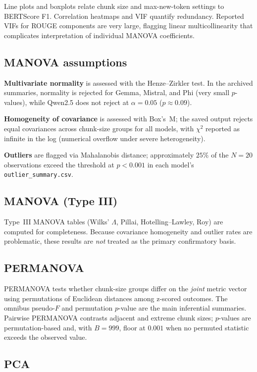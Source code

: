 \documentclass[11pt]{article}
\begin{document}
Line plots and boxplots relate chunk size and max-new-token settings to BERTScore F1. Correlation heatmaps and VIF quantify redundancy. Reported VIFs for ROUGE components are very large, flagging linear multicollinearity that complicates interpretation of individual MANOVA coefficients.

\subsection{MANOVA assumptions}

\textbf{Multivariate normality} is assessed with the Henze--Zirkler test. In the archived summaries, normality is rejected for Gemma, Mistral, and Phi (very small $p$-values), while Qwen2.5 does not reject at $\alpha=0.05$ ($p\approx 0.09$).

\textbf{Homogeneity of covariance} is assessed with Box's~M; the saved output rejects equal covariances across chunk-size groups for all models, with $\chi^2$ reported as infinite in the log (numerical overflow under severe heterogeneity).

\textbf{Outliers} are flagged via Mahalanobis distance; approximately $25\%$ of the $N=20$ observations exceed the threshold at $p<0.001$ in each model's \texttt{outlier\_summary.csv}.

\subsection{MANOVA (Type III)}

Type~III MANOVA tables (Wilks' $\Lambda$, Pillai, Hotelling--Lawley, Roy) are computed for completeness. Because covariance homogeneity and outlier rates are problematic, these results are \emph{not} treated as the primary confirmatory basis.

\subsection{PERMANOVA}

PERMANOVA tests whether chunk-size groups differ on the \emph{joint} metric vector using permutations of Euclidean distances among z-scored outcomes. The omnibus pseudo-$F$ and permutation $p$-value are the main inferential summaries. Pairwise PERMANOVA contrasts adjacent and extreme chunk sizes; $p$-values are permutation-based and, with $B=999$, floor at $0.001$ when no permuted statistic exceeds the observed value.

\subsection{PCA}
\end{document}
